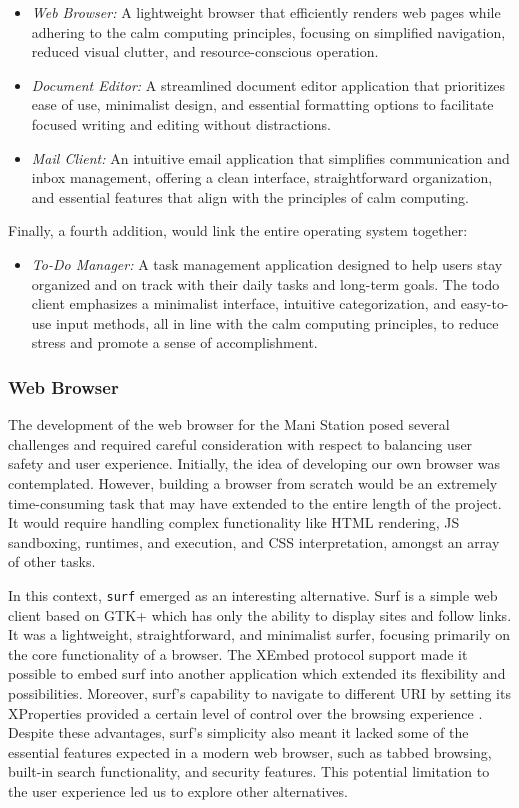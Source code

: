 \documentclass[letterpaper,twocolumn,10pt]{article}
\begin{document}
\begin{itemize}
    \item \emph{Web Browser:} A lightweight browser that efficiently renders web pages while adhering to the calm computing principles, focusing on simplified navigation, reduced visual clutter, and resource-conscious operation.
    \item \emph{Document Editor:} A streamlined document editor application that prioritizes ease of use, minimalist design, and essential formatting options to facilitate focused writing and editing without distractions.
    \item \emph{Mail Client:} An intuitive email application that simplifies communication and inbox management, offering a clean interface, straightforward organization, and essential features that align with the principles of calm computing.
\end{itemize}

Finally, a fourth addition, would link the entire operating system together:

\begin{itemize}
    \item \emph{To-Do Manager:} A task management application designed to help users stay organized and on track with their daily tasks and long-term goals. The todo client emphasizes a minimalist interface, intuitive categorization, and easy-to-use input methods, all in line with the calm computing principles, to reduce stress and promote a sense of accomplishment.
\end{itemize}

\subsubsection{Web Browser}
The development of the web browser for the Mani Station posed several challenges and required careful consideration with respect to balancing user safety and user experience. Initially, the idea of developing our own browser was contemplated. However, building a browser from scratch would be an extremely time-consuming task that may have extended to the entire length of the project. It would require handling complex functionality like HTML rendering, JS sandboxing, runtimes, and execution, and CSS interpretation, amongst an array of other tasks.

In this context, \verb|surf| emerged as an interesting alternative. Surf is a simple web client based on GTK+ which has only the ability to display sites and follow links. It was a lightweight, straightforward, and minimalist surfer, focusing primarily on the core functionality of a browser. The XEmbed protocol support made it possible to embed surf into another application which extended its flexibility and possibilities. Moreover, surf’s capability to navigate to different URI by setting its XProperties provided a certain level of control over the browsing experience \cite{surf}. Despite these advantages, surf's simplicity also meant it lacked some of the essential features expected in a modern web browser, such as tabbed browsing, built-in search functionality, and security features. This potential limitation to the user experience led us to explore other alternatives.
\end{document}
